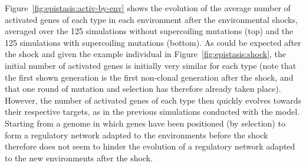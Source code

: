 Figure~\ref{fig:epistasis:activ-by-env} shows the evolution of the average number of activated genes of each type in each environment after the environmental shocks, averaged over the 125 simulations without supercoiling mutations (top) and the 125 simulations with supercoiling mutations (bottom).
As could be expected after the shock and given the example individual in Figure~\ref{fig:epistasis:shock}, the initial number of activated genes is initially very similar for each type (note that the first shown generation is the first non-clonal generation after the shock, and that one round of mutation and selection has therefore already taken place).
However, the number of activated genes of each type then quickly evolves towards their respective targets, as in the previous simulations conducted with the model.
Starting from a genome in which genes have been positioned (by selection) to form a regulatory network adapted to the environments before the shock therefore does not seem to hinder the evolution of a regulatory network adapted to the new environments after the shock.

